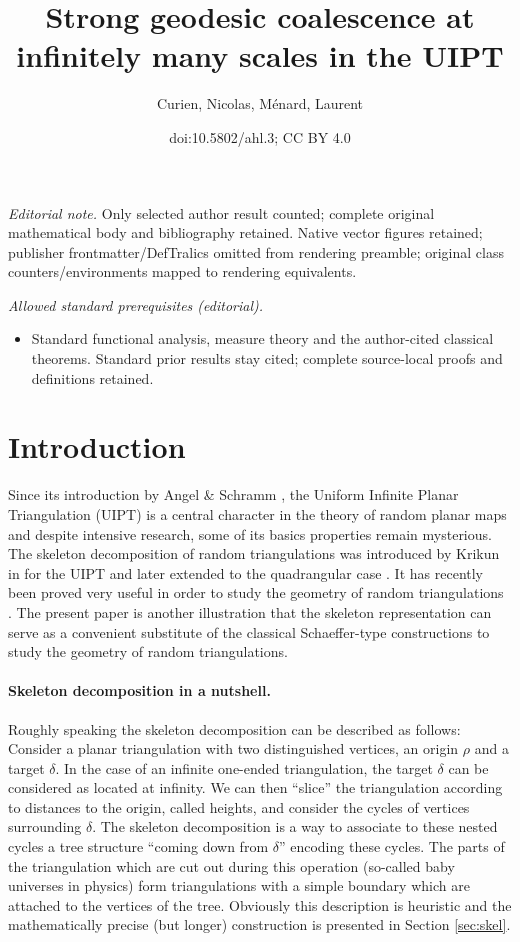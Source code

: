 \documentclass[10pt]{amsart}
\title{Strong geodesic coalescence at infinitely many scales in the UIPT}
\author{Curien, Nicolas, Ménard, Laurent}
\date{doi:10.5802/ahl.3; CC BY 4.0}
\theoremstyle{definition}\newtheorem{defi}[theo]{Definition}\newtheorem{rema}[theo]{Remark}\newtheorem{exam}[theo]{Example}\newtheorem{exem}[theo]{Example}\newtheorem{nota}[theo]{Notation}
\begin{document}
\maketitle
\noindent\textit{Editorial note.} Only selected author result counted; complete original mathematical body and bibliography retained. Native vector figures retained; publisher frontmatter/DefTralics omitted from rendering preamble; original class counters/environments mapped to rendering equivalents.\par\medskip
\noindent\textit{Allowed standard prerequisites (editorial).}\begin{itemize}
\item Standard functional analysis, measure theory and the author-cited classical theorems. Standard prior results stay cited; complete source-local proofs and definitions retained.
\end{itemize}\medskip
\section{Introduction}
Since its introduction by Angel \& Schramm \cite{AS}, the Uniform Infinite Planar Triangulation (UIPT) is a central character in the theory of random planar maps and despite intensive research, some of its basics properties remain mysterious. The skeleton decomposition of random triangulations was introduced by Krikun in \cite{Kr} for the UIPT and later extended to the quadrangular case \cite{Kr,LGL17}. It has recently been proved very useful in order to study the geometry of random triangulations  \cite{CLGfpp,AR,LGL17,Budzinski18,M}. The present paper is another illustration that the skeleton representation can serve as a convenient substitute of the classical Schaeffer-type constructions to study the geometry of random triangulations.

\paragraph{Skeleton decomposition in a nutshell.} Roughly speaking the skeleton decomposition can be described as follows: Consider a planar triangulation with two distinguished vertices, an origin $\rho$ and a target $\delta$. In the case of an infinite one-ended triangulation, the target $\delta$ can be considered as located at infinity. We can then ``slice'' the triangulation according to distances to the origin, called heights, and consider the cycles of vertices surrounding $\delta$. The skeleton decomposition is a way to associate to these nested cycles a tree structure ``coming down from $\delta$'' encoding these cycles. The parts of the triangulation which are cut out during this operation (so-called baby universes in physics) form triangulations with a simple boundary  which are attached to the vertices of the tree. Obviously this description is heuristic  and the mathematically precise (but longer) construction is presented in Section \ref{sec:skel}.
\end{document}
